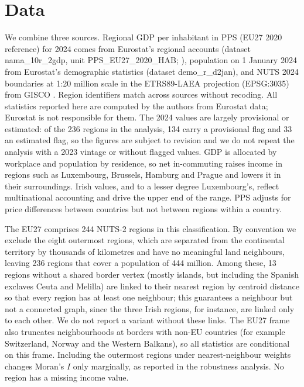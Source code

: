 \documentclass[11pt]{article}
\begin{document}
\section{Data}

We combine three sources. Regional GDP per inhabitant in PPS (EU27 2020 reference) for 2024 comes from Eurostat's regional accounts (dataset nama\_10r\_2gdp, unit PPS\_EU27\_2020\_HAB; \citealp{Eurostat_Database}), population on 1 January 2024 from Eurostat's demographic statistics (dataset demo\_r\_d2jan), and NUTS 2024 boundaries at 1:20 million scale in the ETRS89-LAEA projection (EPSG:3035) from GISCO \citep{Eurostat_GISCO_NUTS}. Region identifiers match across sources without recoding. All statistics reported here are computed by the authors from Eurostat data; Eurostat is not responsible for them. The 2024 values are largely provisional or estimated: of the 236 regions in the analysis, 134 carry a provisional flag and 33 an estimated flag, so the figures are subject to revision and we do not repeat the analysis with a 2023 vintage or without flagged values. GDP is allocated by workplace and population by residence, so net in-commuting raises income in regions such as Luxembourg, Brussels, Hamburg and Prague and lowers it in their surroundings. Irish values, and to a lesser degree Luxembourg's, reflect multinational accounting and drive the upper end of the range. PPS adjusts for price differences between countries but not between regions within a country.

The EU27 comprises 244 NUTS-2 regions in this classification. By convention we exclude the eight outermost regions, which are separated from the continental territory by thousands of kilometres and have no meaningful land neighbours, leaving 236 regions that cover a population of 444 million.
Among these, 13 regions without a shared border vertex (mostly islands, but including the Spanish exclaves Ceuta and Melilla) are linked to their nearest region by centroid distance so that every region has at least one neighbour; this guarantees a neighbour but not a connected graph, since the three Irish regions, for instance, are linked only to each other. We do not report a variant without these links. The EU27 frame also truncates neighbourhoods at borders with non-EU countries (for example Switzerland, Norway and the Western Balkans), so all statistics are conditional on this frame. Including the outermost regions under nearest-neighbour weights changes Moran's $I$ only marginally, as reported in the robustness analysis. No region has a missing income value.
\end{document}
